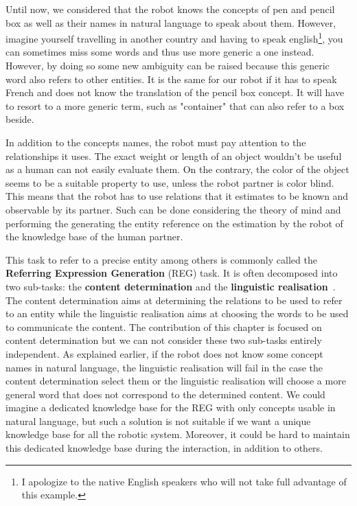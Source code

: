 Until now, we considered that the robot knows the concepts of pen and pencil box as well as their names in natural language to speak about them. However, imagine yourself travelling in another country and having to speak english\footnote{I apologize to the native English speakers who will not take full advantage of this example.}, you can sometimes miss some words and thus use more generic a one instead. However, by doing so some new ambiguity can be raised because this generic word also refers to other entities. It is the same for our robot if it has to speak French and does not know the translation of the pencil box concept. It will have to resort to a more generic term, such as "container" that can also refer to a box beside.

In addition to the concepts names, the robot must pay attention to the relationships it uses. The exact weight or length of an object wouldn't be useful as a human can not easily evaluate them. On the contrary, the color of the object seems to be a suitable property to use, unless the robot partner is color blind. This means that the robot has to use relations that it estimates to be known and observable by its partner. Such can be done considering the theory of mind and performing the generating the entity reference on the estimation by the robot of the knowledge base of the human partner.

This task to refer to a precise entity among others is commonly called the \textbf{Referring Expression Generation} (REG) task. It is often decomposed into two sub-tasks: the \textbf{content determination} and the \textbf{linguistic realisation}~\cite{krahmer_2012_computational}. The content determination aims at determining the relations to be used to refer to an entity while the linguistic realisation aims at choosing the words to be used to communicate the content. The contribution of this chapter is focused on content determination but we can not consider these two sub-tasks entirely independent. As explained earlier, if the robot does not know some concept names in natural language, the linguistic realisation will fail in the case the content determination select them or the linguistic realisation will choose a more general word that does not correspond to the determined content. We could imagine a dedicated knowledge base for the REG with only concepts usable in natural language, but such a solution is not suitable if we want a unique knowledge base for all the robotic system. Moreover, it could be hard to maintain this dedicated knowledge base during the interaction, in addition to others. 

